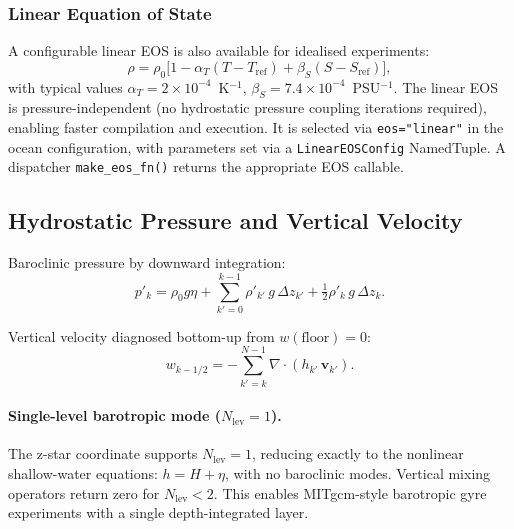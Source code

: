 \documentclass[11pt,a4paper]{article}
\newcommand{\half}{\tfrac{1}{2}}
\begin{document}
\subsubsection{Linear Equation of State}

A configurable linear EOS is also available for idealised experiments:
\begin{equation}
  \rho = \rho_0\bigl[1 - \alpha_T(T-T_{\mathrm{ref}}) + \beta_S(S-S_{\mathrm{ref}})\bigr],
\end{equation}
with typical values $\alpha_T=2\times10^{-4}$~K$^{-1}$, $\beta_S=7.4\times10^{-4}$~PSU$^{-1}$.
The linear EOS is pressure-independent (no hydrostatic pressure coupling iterations required), enabling faster compilation and execution.  It is selected via \texttt{eos="linear"} in the ocean configuration, with parameters set via a \texttt{LinearEOSConfig} NamedTuple.  A dispatcher \texttt{make\_eos\_fn()} returns the appropriate EOS callable.

\subsection{Hydrostatic Pressure and Vertical Velocity}

Baroclinic pressure by downward integration:
\begin{equation}
  p'_k = \rho_0 g\eta + \sum_{k'=0}^{k-1}\rho'_{k'}\,g\,\Delta z_{k'} + \half\rho'_k\,g\,\Delta z_k.
\end{equation}

Vertical velocity diagnosed bottom-up from $w(\text{floor})=0$:
\begin{equation}
  w_{k-1/2} = -\sum_{k'=k}^{N-1}\nabla\!\cdot\!(h_{k'}\,\bm v_{k'}).
\end{equation}

\paragraph{Single-level barotropic mode ($N_{\mathrm{lev}}=1$).}
The z-star coordinate supports $N_{\mathrm{lev}}=1$, reducing exactly to the nonlinear shallow-water equations: $h = H + \eta$, with no baroclinic modes.  Vertical mixing operators return zero for $N_{\mathrm{lev}}<2$.  This enables MITgcm-style barotropic gyre experiments with a single depth-integrated layer.

\end{document}
